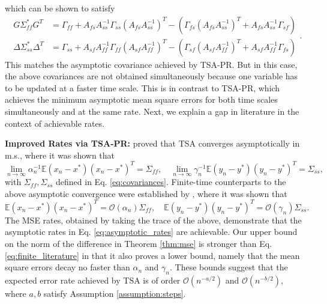 which can be shown to satisfy
\begin{equation}\label{eq:optimal_covariance}
    \begin{split}
        G \Sigma_{ff}^* G^T 
        &= \Gamma_{ff} + A_{fs} A_{ss}^{-1} \Gamma_{ss} (A_{fs} A_{ss}^{-1})^T 
        - \left(\Gamma_{fs} (A_{fs} A_{ss}^{-1})^T + A_{fs} A_{ss}^{-1} \Gamma_{sf}\right)  \\
        \Delta \Sigma_{ss}^* \Delta^T 
        &= \Gamma_{ss} + A_{sf} A_{ff}^{-1} \Gamma_{ff} (A_{sf} A_{ff}^{-1})^T
        - \left(\Gamma_{sf} (A_{sf} A_{ff}^{-1})^T + A_{sf} A_{ff}^{-1} \Gamma_{fs}\right)    
    \end{split} .
\end{equation}
This matches the asymptotic covariance achieved by TSA-PR.
But in this case, the above covariances are not obtained simultaneously because one variable has to be updated at a faster time scale. 
This is in contrast to TSA-PR, which achieves the minimum asymptotic mean square errors for both time scales simultaneously and at the same rate. 
Next, we explain a gap in literature in the context of achievable rates.

\textbf{Improved Rates via TSA-PR:}
\citet{konda2004convergence} proved that TSA converges asymptotically in m.s., where it was shown that
\begin{equation}\label{eq:asymptotic_rates}
    \lim_{n \to \infty} \alpha_n^{-1} \mathbb{E} (x_n - x^*) (x_n - x^*)^T = \Sigma_{ff}, 
    \quad 
    \lim_{n \to \infty} \gamma_n^{-1} \mathbb{E} (y_n - y^*) (y_n - y^*)^T = \Sigma_{ss} ,
\end{equation}
with $\Sigma_{ff}, \Sigma_{ss}$ defined in Eq. \eqref{eq:covariances}. 
Finite-time counterparts to the above asymptotic convergence were established by \citet{dalal2018finite,kaledin2020finite,haque2023tightfinitetimebounds}, where it was shown that
\begin{equation}\label{eq:finite_literature}
    \mathbb{E}(x_n - x^*) (x_n - x^*)^T = \mathcal{O}\left(\alpha_n\right) \Sigma_{ff} , \quad 
    \mathbb{E}(y_n - y^*) (y_n - y^*)^T = \mathcal{O}\left(\gamma_n \right) \Sigma_{ss} .    
\end{equation}
The MSE rates, obtained by taking the trace of the above, demonstrate that the asymptotic rates in Eq. \eqref{eq:asymptotic_rates} are achievable.
Our upper bound on the norm of the difference in Theorem \ref{thm:mse} is stronger than Eq. \eqref{eq:finite_literature} in that it also proves a lower bound, namely that the mean square errors decay no faster than $\alpha_n$ and $\gamma_n$.
These bounds suggest that the expected error rate achieved by TSA is of order $\mathcal{O}(n^{-a/2})$ and $\mathcal{O}(n^{-b/2})$, where $a, b$ satisfy Assumption \ref{assumption:steps}. 


